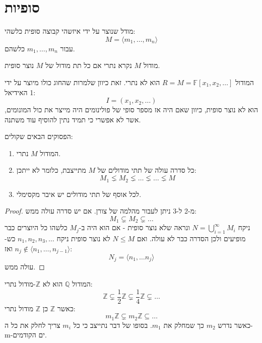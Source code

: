 \documentclass{tstextbook}
\begin{document}
\section{סופיות}

\begin{definition}
מודל שנוצר על ידי איזשהי קבוצה סופית כלשהי:
$$M=\langle m_{1},\dots,m_{n} \rangle $$
עבור \(m_{1},\dots ,m_{n}\) כלשהם.

\end{definition}
\begin{definition}
מודול \(M\) נקרא נתרי אם כל תת מודול של \(M\) נוצר סופית.

\end{definition}
\begin{example}
המודול \(R=M=\mathbb{F}[x_{1},x_{2},\dots]\) הוא לא נתרי. זאת כיוון שלמרות שהחוג כולו מיוצר על ידי 1 האידיאל:
$$I=(x_{1},x_{2},\dots)$$
הוא לא נוצר סופית, כיוון שאם היה אז מספר סופי של פולינומים היה מייצר את כול המונומים, אשר לא אפשרי כי תמיד נתין להוסיף עוד משתנה.

\end{example}
\begin{proposition}
הפסוקים הבאים שקולים:

  \begin{enumerate}
    \item המודול \(M\) נתרי. 


    \item כל סדרה עולה של תתי מודולים של \(M\) מתייצבת, כלומר לא ייתכן: 
$$M_{1} \lneq M_{2}\lneq \dots \lneq \dots \lneq M$$


    \item לכל אוסף של תתי מודולים יש איבר מקסימלי. 


  \end{enumerate}
\end{proposition}
\begin{proof}
מ-2 ל-3 ניתן לעבור מהלמה של צורן.
אם יש סדרה עולה ממש:
$$M_{1} \subsetneq M_{2} \subsetneq \dots$$
ניקח \(N=\bigcup_{i=1}^{\infty}M_{i}\) ונראה שלא נוצר סופית - אם הוא היה ב-\(M_{j}\) כלשהו כל היוצרים כבר מופיעים ולכן הסדרה כבר לא עולה. ואם \(N\leq M\) לא נוצר סופית ניקח \(n_{1},n_{2},n_{3},\dots\) כש-\(n_{j}\not\in \langle n_{1},\dots,n_{j-1} \rangle\) ואז:
$$N_{j}=\langle n_{1},\dots n_{j} \rangle $$
עולה ממש.

\end{proof}
\begin{example}
המודול \(\mathbb{Q}\) הוא לא \(\mathbb{Z}\)-מודול נתרי:
$$\mathbb{Z}\subsetneq \frac{1}{2}\mathbb{Z} \subsetneq \frac{1}{4}\mathbb{Z} \subsetneq \dots$$
כאשר \(\mathbb{Z}\) כן \(\mathbb{Z}\) מודול נתרי:
$$m_{1}\mathbb{Z} \subsetneq m_{2}\mathbb{Z} \subseteq \dots $$
כאשר נדרש \(m_{2}\) כך שמחלק את \(m_{1}\). בסופו של דבר נתייצב כי כל \(m_{i}\) צריך לחלק את כל ה-m-ים הקודמים.

\end{example}
\end{document}
